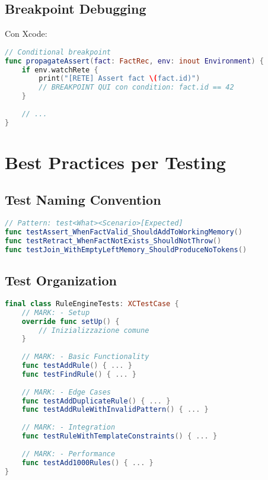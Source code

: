 \subsection{Breakpoint Debugging}

Con Xcode:

\begin{lstlisting}[language=Swift]
// Conditional breakpoint
func propagateAssert(fact: FactRec, env: inout Environment) {
    if env.watchRete {
        print("[RETE] Assert fact \(fact.id)")
        // BREAKPOINT QUI con condition: fact.id == 42
    }
    
    // ...
}
\end{lstlisting}

\section{Best Practices per Testing}

\subsection{Test Naming Convention}

\begin{lstlisting}[language=Swift]
// Pattern: test<What><Scenario>[Expected]
func testAssert_WhenFactValid_ShouldAddToWorkingMemory()
func testRetract_WhenFactNotExists_ShouldNotThrow()
func testJoin_WithEmptyLeftMemory_ShouldProduceNoTokens()
\end{lstlisting}

\subsection{Test Organization}

\begin{lstlisting}[language=Swift]
final class RuleEngineTests: XCTestCase {
    // MARK: - Setup
    override func setUp() {
        // Inizializzazione comune
    }
    
    // MARK: - Basic Functionality
    func testAddRule() { ... }
    func testFindRule() { ... }
    
    // MARK: - Edge Cases
    func testAddDuplicateRule() { ... }
    func testAddRuleWithInvalidPattern() { ... }
    
    // MARK: - Integration
    func testRuleWithTemplateConstraints() { ... }
    
    // MARK: - Performance
    func testAdd1000Rules() { ... }
}
\end{lstlisting}

